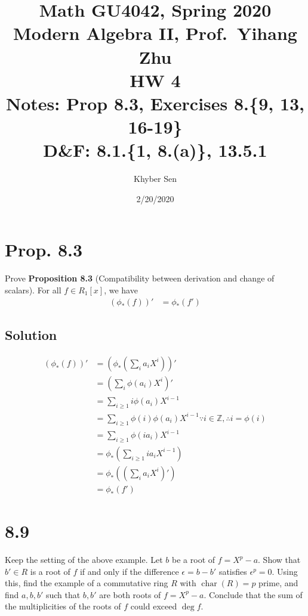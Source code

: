 \documentclass[fleqn]{article}
\title{
Math GU4042, Spring 2020 \\
Modern Algebra II, Prof.\ Yihang Zhu \\
HW 4 \\
Notes: Prop 8.3, Exercises 8.\{9, 13, 16-19\} \\
D\&F: 8.1.\{1, 8.(a)\}, 13.5.1
}
\author{Khyber Sen}
\date{2/20/2020}
\DeclareMathOperator{\Char}{char}
\begin{document}
    
    \maketitle
    
    \section{Prop. 8.3}
    Prove \textbf{Proposition 8.3} (Compatibility between derivation and change of scalars).  For all $f \in R_1[x]$, we have
    \begin{align}
        (\phi_*(f))' &= \phi_*\left(f'\right)
    \end{align}
        
        \subsection{Solution}
        \begin{align}
            (\phi_*(f))' &= \left(\phi_*\left(\sum\limits_i a_i X^i\right)\right)' \\
                &= \left(\sum\limits_i \phi(a_i) X^i\right)' \\
                &= \sum\limits_{i \geq 1} i \phi(a_i) X^{i - 1} \\
                &= \sum\limits_{i \geq 1} \phi(i) \phi(a_i) X^{i - 1} \because{} i \in \mathbb{Z}, \therefore{} i = \phi(i) \\
                &= \sum\limits_{i \geq 1} \phi(i a_i) X^{i - 1} \\
                &= \phi_*\left(\sum\limits_{i \geq 1} i a_i X^{i - 1}\right) \\
                &= \phi_*\left(\left(\sum\limits_i a_i X^i\right)'\right) \\
                &= \phi_*\left(f'\right)
        \end{align}
    
    \section{8.9}
    Keep the setting of the above example.  Let $b$ be a root of $f = X^p - a$.  Show that $b' \in R$ is a root of $f$ if and only if the difference $\epsilon = b - b'$ satisfies $\epsilon^p = 0$.  Using this, find the example of a commutative ring $R$ with $\Char(R) = p$ prime, and find $a, b, b'$ such that $b, b'$ are both roots of $f = X^p - a$.  Conclude that the sum of the multiplicities of the roots of $f$ could exceed $\deg f$.
        
\end{document}
